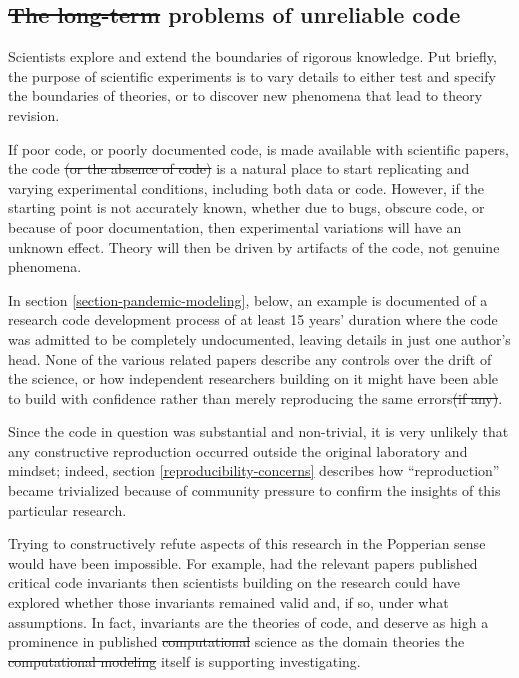 \documentclass{comjnl}
\providecommand{\DIFadd}[1]{{\protect\color{blue}\uwave{#1}}} %
\providecommand{\DIFdel}[1]{{\protect\color{red}\sout{#1}}}                      %
\providecommand{\DIFaddbegin}{} %
\providecommand{\DIFaddend}{} %
\providecommand{\DIFdelbegin}{} %
\providecommand{\DIFdelend}{} %
\begin{document}
\DIFdelend \subsection{\DIFdelbegin \DIFdel{The long-term }\DIFdelend \DIFaddbegin \DIFadd{Long-term }\DIFaddend problems of unreliable code}
Scientists explore and extend the boundaries of rigorous knowledge. Put briefly, the purpose of scientific experiments is to vary details to either test and specify the boundaries of theories, or to discover new phenomena that \DIFaddbegin \DIFadd{then }\DIFaddend lead to theory revision. 

If poor code, or poorly documented code, is made available with scientific papers, the code \DIFdelbegin \DIFdel{(or the absence of code) }\DIFdelend is a natural place to start replicating and varying experimental conditions,  including both data or code. However, if the starting point is not accurately known, whether due to bugs, obscure code, or because of poor documentation, then experimental variations will have an unknown effect. Theory will then be driven by artifacts of the code, not genuine phenomena. 

In section \ref{section-pandemic-modeling}, below, an example is documented of a research code development process of at least 15 years' duration where the code was admitted to be completely undocumented, leaving details in just one author's head. None of the various related papers describe any controls over the drift of the science, or how independent researchers building on it might have been able to build with confidence rather than merely reproducing the same errors\DIFdelbegin \DIFdel{(if any)}\DIFdelend . 

Since the code in question was substantial and non-trivial, it is very unlikely that any constructive reproduction occurred outside the original laboratory and mindset; indeed, section \ref{reproducibility-concerns} describes how ``reproduction'' became trivialized because of community pressure to confirm the insights of this particular research. 

Trying to constructively refute aspects of this research in the Popperian sense \cite{popper-conjectures-refutations} would have been impossible. For example, had the relevant papers published critical code invariants then scientists building on the research could have explored whether those invariants remained valid and, if so, under what assumptions. In fact, invariants are the theories of code, and deserve as high a prominence in published  \DIFdelbegin \DIFdel{computational }\DIFdelend science as the domain theories the \DIFdelbegin \DIFdel{computational modeling }\DIFdelend \DIFaddbegin \DIFadd{code }\DIFaddend itself is supporting investigating. 
\end{document}
